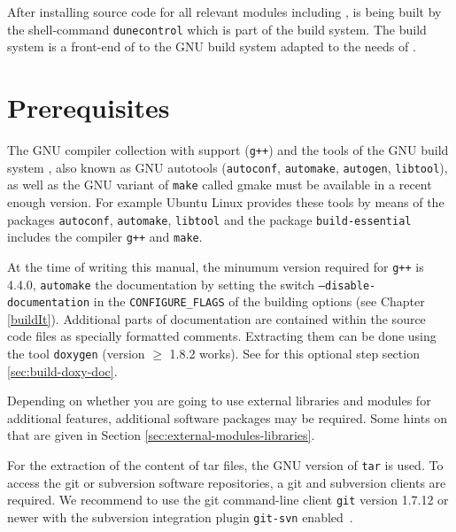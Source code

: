 After installing source code for all relevant \Dune modules including
\eWoms, \Dune is being built by the shell-command \texttt{dunecontrol}
which is part of the \Dune build system. The \Dune build system is a
front-end of to the GNU build system adapted to the needs of \Dune.

\section{Prerequisites} \label{sec:prerequisites}

The GNU compiler collection with \Cplusplus support (\texttt{g++}) and
the tools of the GNU build system \cite{GNU-BS}, also known as GNU
autotools (\texttt{autoconf}, \texttt{automake}, \texttt{autogen},
\texttt{libtool}), as well as the GNU variant of \texttt{make} called
gmake must be available in a recent enough version. For example Ubuntu
Linux provides these tools by means of the packages \texttt{autoconf},
\texttt{automake}, \texttt{libtool} and the  package 
\texttt{build-essential} includes the \Cplusplus compiler
\texttt{g++} and \texttt{make}.

At the time of writing this manual, the minumum version required for
\texttt{g++} is 4.4.0, \texttt{automake}  the documentation by setting the switch
\texttt{--disable-documentation} in the \texttt{CONFIGURE\_FLAGS} of
the building options (see Chapter \ref{buildIt}).  Additional parts of
documentation are contained within the source code files as specially
formatted comments.  Extracting them can be done using the tool
\texttt{doxygen} (version $\geqslant$ 1.8.2 works).  See for this
optional step section \ref{sec:build-doxy-doc}.

Depending on whether you are going to use external libraries and
modules for additional \Dune features, additional software packages
may be required. Some hints on that are given in Section
\ref{sec:external-modules-libraries}.

For the extraction of the content of tar files, the GNU version of
\texttt{tar} is used.  To access the git or subversion software
repositories, a git and subversion clients are required. We recommend
to use the git command-line client \texttt{git} version 1.7.12 or
newer with the subversion integration plugin \texttt{git-svn} enabled~\cite{GIT-HP}.

